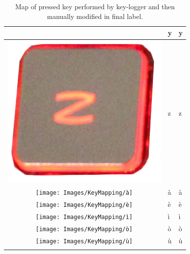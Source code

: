 \begin{longtable}{|cll|}
\begin{minipage}[c]{.3\textwidth}
\vspace{0.2cm}
\end{minipage} & y & y\\
\hline
\begin{minipage}[c]{.3\textwidth}
\vspace{0.2cm}
\includegraphics[scale=0.06]{Images/KeyMapping/z}
\vspace{0.2cm}
\end{minipage} & z & z\\
\hline
\begin{minipage}[c]{.3\textwidth}
\vspace{0.2cm}
\texttt{[image: Images/KeyMapping/à]}
\vspace{0.2cm}
\end{minipage} & à & à\\
\hline
\begin{minipage}[c]{.3\textwidth}
\vspace{0.2cm}
\texttt{[image: Images/KeyMapping/è]}
\vspace{0.2cm}
\end{minipage} & è & è\\
\hline
\begin{minipage}[c]{.3\textwidth}
\vspace{0.2cm}
\texttt{[image: Images/KeyMapping/ì]}
\vspace{0.2cm}
\end{minipage} & ì & ì\\
\hline
\begin{minipage}[c]{.3\textwidth}
\vspace{0.2cm}
\texttt{[image: Images/KeyMapping/ò]}
\vspace{0.2cm}
\end{minipage} & ò & ò\\
\hline
\begin{minipage}[c]{.3\textwidth}
\vspace{0.2cm}
\texttt{[image: Images/KeyMapping/ù]}
\vspace{0.2cm}
\end{minipage} & ù & ù\\
\hline
\caption{Map of pressed key performed by key-logger and then manually modified in final label.}
\end{longtable}
\normalsize
